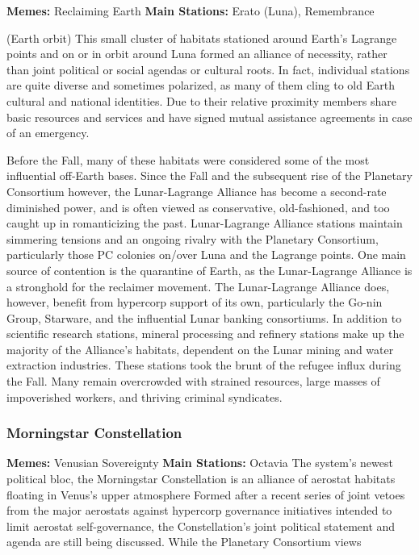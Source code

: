 \textbf{Memes: }Reclaiming Earth
\textbf{Main Stations:} Erato (Luna), Remembrance 

(Earth orbit)
This small cluster of habitats stationed around Earth's 
Lagrange points and on or in orbit around Luna 
formed an alliance of necessity, rather than joint 
political or social agendas or cultural roots. In fact, 
individual stations are quite diverse and sometimes 
polarized, as many of them cling to old Earth cultural 
and national identities. Due to their relative proximity
members share basic resources and services and
have signed mutual assistance agreements in case of 
an emergency.

Before the Fall, many of these habitats were 
considered some of the most 
influential off-Earth bases. 
Since the Fall and the 
subsequent rise of 
the Planetary Consortium
however,
the Lunar-Lagrange 
Alliance has become 
a second-rate diminished
power, and is
often viewed as conservative, old-fashioned, and 
too caught up in romanticizing the past. Lunar-Lagrange
Alliance stations maintain simmering
tensions and an ongoing rivalry with the Planetary 
Consortium, particularly those PC colonies on/over 
Luna and the Lagrange points. One main source of 
contention is the quarantine of Earth, as the Lunar-Lagrange
Alliance is a stronghold for the reclaimer
movement. The Lunar-Lagrange Alliance does, 
however, benefit from hypercorp support of its own, 
particularly the Go-nin Group, Starware, and the 
influential Lunar banking consortiums.
In addition to scientific research stations, mineral 
processing and refinery stations make up the majority
of the Alliance's habitats, dependent on the Lunar
mining and water extraction industries. These stations 
took the brunt of the refugee influx during the Fall. 
Many remain overcrowded with strained resources, 
large masses of impoverished workers, and thriving 
criminal syndicates.

\subsubsection{Morningstar Constellation}

\textbf{Memes:} Venusian Sovereignty
\textbf{Main Stations:} Octavia
The system's newest political bloc, the Morningstar 
Constellation is an alliance of aerostat 
habitats floating in Venus's upper atmosphere
Formed after a recent
series of joint vetoes from the 
major aerostats against hypercorp
governance initiatives
intended to limit aerostat 
self-governance, the Constellation's
joint political
statement and agenda are still 
being discussed. While the 
Planetary Consortium views 

